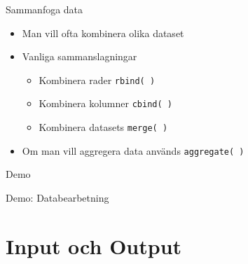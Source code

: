 \documentclass[
  11pt,
  ignorenonframetext,
]{beamer}
\providecommand{\tightlist}{%
  \setlength{\itemsep}{0pt}\setlength{\parskip}{0pt}}
\begin{document}
\begin{frame}{Sammanfoga data}
\label{sammanfoga-data}
\begin{itemize}
\tightlist
\item
  Man vill ofta kombinera olika dataset
\item
  Vanliga sammanslagningar

  \begin{itemize}
  \tightlist
  \item
    Kombinera rader \texttt{rbind( )}
  \item
    Kombinera kolumner \texttt{cbind( )}
  \item
    Kombinera datasets \texttt{merge( )}
  \end{itemize}
\item
  Om man vill aggregera data används \texttt{aggregate( )}
\end{itemize}
\end{frame}

\begin{frame}{Demo}
\label{demo-3}
\begin{block}{Demo: Databearbetning}
\label{demo-databearbetning}
\end{block}
\end{frame}

\section{Input och Output}\label{input-och-output}
\end{document}
